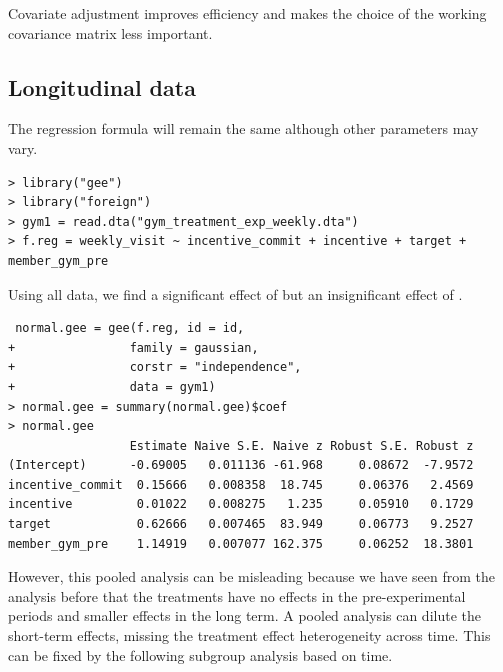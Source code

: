 Covariate adjustment improves efficiency and makes the choice of the working covariance matrix less important. 

 
 
 
\subsection{Longitudinal data}


The regression formula  will remain the same although other parameters may vary. 

\begin{lstlisting}
> library("gee")
> library("foreign")
> gym1 = read.dta("gym_treatment_exp_weekly.dta")
> f.reg = weekly_visit ~ incentive_commit + incentive + target + member_gym_pre
\end{lstlisting}


Using all data, we find a significant effect of  but an insignificant effect of . 

\begin{lstlisting}
 normal.gee = gee(f.reg, id = id, 
+                family = gaussian, 
+                corstr = "independence", 
+                data = gym1)
> normal.gee = summary(normal.gee)$coef
> normal.gee
                 Estimate Naive S.E. Naive z Robust S.E. Robust z
(Intercept)      -0.69005   0.011136 -61.968     0.08672  -7.9572
incentive_commit  0.15666   0.008358  18.745     0.06376   2.4569
incentive         0.01022   0.008275   1.235     0.05910   0.1729
target            0.62666   0.007465  83.949     0.06773   9.2527
member_gym_pre    1.14919   0.007077 162.375     0.06252  18.3801
\end{lstlisting}

However, this pooled analysis can be misleading because we have seen from the analysis before that the treatments have no effects in the pre-experimental periods and smaller effects in the long term. A pooled analysis can dilute the short-term effects, missing the treatment effect heterogeneity across time. This can be fixed by the following subgroup analysis based on time.

